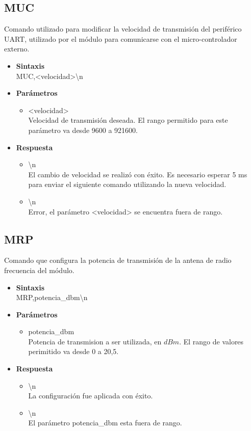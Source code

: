 \documentclass[a4paper,spanish]{article}
\begin{document}
\subsection{MUC}
Comando utilizado para modificar la velocidad de transmisión del periférico UART, utilizado por el módulo para comunicarse con el micro-controlador externo.
\begin{itemize}
	\item \textbf{Sintaxis}\\
	{\ttfamily MUC,\textless velocidad\textgreater\textbackslash n}
	\item \textbf{Parámetros}
	\begin{itemize}
		\item{\ttfamily \textless velocidad\textgreater}\\
		Velocidad de transmisión deseada. El rango permitido para este parámetro va desde 9600 a 921600. 
	\end{itemize}
	\item \textbf{Respuesta}
	\begin{itemize}
		\item {\textbackslash n} \\
		El cambio de velocidad se realizó con éxito. Es necesario esperar 5 ms para enviar el siguiente comando utilizando la nueva velocidad.
		\item{\textbackslash n} \\
		Error, el parámetro {\ttfamily \textless velocidad\textgreater}  se encuentra fuera de rango. 
	\end{itemize}
\end{itemize}

\subsection{MRP}
Comando que configura la potencia de transmisión de la antena de radio frecuencia del módulo.
\begin{itemize}
	\item \textbf{Sintaxis}\\
	{\ttfamily MRP,potencia\_dbm\textbackslash n}
	\item \textbf{Parámetros}\\
	\begin{itemize}
		\item{\ttfamily potencia\_dbm}\\
		Potencia de transmision a ser utilizada, en $dBm$. El rango de valores perimitido va desde 0 a 20,5. 
	\end{itemize}
	\item \textbf{Respuesta}
	\begin{itemize}
		\item {\textbackslash n} \\
		La configuración fue aplicada con éxito.
		\item {\textbackslash n} \\
		El parámetro {\ttfamily potencia\_dbm} esta fuera de rango.
	\end{itemize}
\end{itemize}
\end{document}
